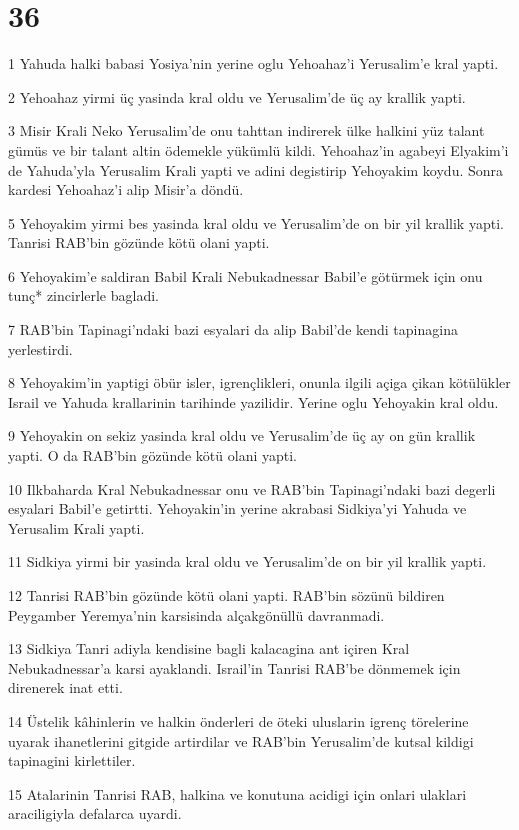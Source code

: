 \chapter{36}

\par 1 Yahuda halki babasi Yosiya'nin yerine oglu Yehoahaz'i Yerusalim'e kral yapti.
\par 2 Yehoahaz yirmi üç yasinda kral oldu ve Yerusalim'de üç ay krallik yapti.
\par 3 Misir Krali Neko Yerusalim'de onu tahttan indirerek ülke halkini yüz talant gümüs ve bir talant altin ödemekle yükümlü kildi. Yehoahaz'in agabeyi Elyakim'i de Yahuda'yla Yerusalim Krali yapti ve adini degistirip Yehoyakim koydu. Sonra kardesi Yehoahaz'i alip Misir'a döndü.
\par 5 Yehoyakim yirmi bes yasinda kral oldu ve Yerusalim'de on bir yil krallik yapti. Tanrisi RAB'bin gözünde kötü olani yapti.
\par 6 Yehoyakim'e saldiran Babil Krali Nebukadnessar Babil'e götürmek için onu tunç* zincirlerle bagladi.
\par 7 RAB'bin Tapinagi'ndaki bazi esyalari da alip Babil'de kendi tapinagina yerlestirdi.
\par 8 Yehoyakim'in yaptigi öbür isler, igrençlikleri, onunla ilgili açiga çikan kötülükler Israil ve Yahuda krallarinin tarihinde yazilidir. Yerine oglu Yehoyakin kral oldu.
\par 9 Yehoyakin on sekiz yasinda kral oldu ve Yerusalim'de üç ay on gün krallik yapti. O da RAB'bin gözünde kötü olani yapti.
\par 10 Ilkbaharda Kral Nebukadnessar onu ve RAB'bin Tapinagi'ndaki bazi degerli esyalari Babil'e getirtti. Yehoyakin'in yerine akrabasi Sidkiya'yi Yahuda ve Yerusalim Krali yapti.
\par 11 Sidkiya yirmi bir yasinda kral oldu ve Yerusalim'de on bir yil krallik yapti.
\par 12 Tanrisi RAB'bin gözünde kötü olani yapti. RAB'bin sözünü bildiren Peygamber Yeremya'nin karsisinda alçakgönüllü davranmadi.
\par 13 Sidkiya Tanri adiyla kendisine bagli kalacagina ant içiren Kral Nebukadnessar'a karsi ayaklandi. Israil'in Tanrisi RAB'be dönmemek için direnerek inat etti.
\par 14 Üstelik kâhinlerin ve halkin önderleri de öteki uluslarin igrenç törelerine uyarak ihanetlerini gitgide artirdilar ve RAB'bin Yerusalim'de kutsal kildigi tapinagini kirlettiler.
\par 15 Atalarinin Tanrisi RAB, halkina ve konutuna acidigi için onlari ulaklari araciligiyla defalarca uyardi.
